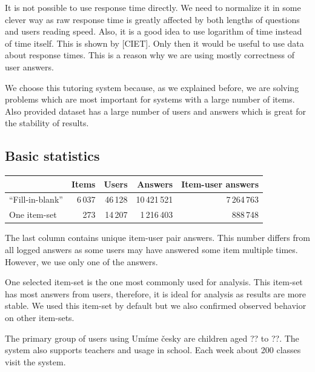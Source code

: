 \documentclass[
  digital, %
  table,   %
  nolof,     %
  nolot,     %
  nocover
]{fithesis3}
\begin{document}
It is not possible to use response time directly. We need to normalize it in some clever way as raw response time is greatly affected by both lengths of questions and users reading speed. Also, it is a good idea to use logarithm of time instead of time itself. This is shown by [CIET]. Only then it would be useful to use data about response times. This is a reason why we are using mostly correctness of user answers.



We choose this tutoring system because, as we explained before, we are solving problems which are most important for systems with a large number of items. Also provided dataset has a large number of users and answers which is great for the stability of results.

\subsection{Basic statistics}\label{basic-statistics}

\begin{center}
  \begin{tabular}{|l|r r r r|}
    \hline
     & Items & Users & Answers & Item-user answers \\
    \hline\hline
    ``Fill-in-blank'' & 6\,037 & 46\,128 & 10\,421\,521 & 7\,264\,763 \\
    \hline
    One item-set & 273 & 14\,207 & 1\,216\,403 & 888\,748 \\
    \hline
  \end{tabular}
\end{center}

The last column contains unique item-user pair answers. This number differs from all logged answers as some users may have answered some item multiple times. However, we use only one of the answers.

One selected item-set is the one most commonly used for analysis. This item-set has most answers from users, therefore, it is ideal for analysis as results are more stable. We used this item-set by default but we also confirmed observed behavior on other item-sets.


The primary group of users using Umíme česky are children aged ?? to ??. The system also supports teachers and usage in school. Each week about 200 classes visit the system.
\end{document}

